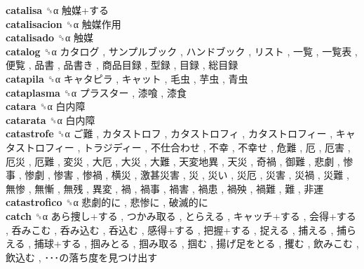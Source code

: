 \textbf{catalisa} ␝α   触媒+する   \\
\textbf{catalisacion} ␝α   触媒作用   \\
\textbf{catalisado} ␝α   触媒   \\
\textbf{catalog} ␝α   カタログ ,  サンプルブック ,  ハンドブック ,  リスト ,  一覧 ,  一覧表 ,  便覧 ,  品書 ,  品書き ,  商品目録 ,  型録 ,  目録 ,  総目録   \\
\textbf{catapila} ␝α   キャタピラ ,  キャット ,  毛虫 ,  芋虫 ,  青虫   \\
\textbf{cataplasma} ␝α   プラスター ,  漆喰 ,  漆食   \\
\textbf{catara} ␝α   白内障   \\
\textbf{catarata} ␝α   白内障   \\
\textbf{catastrofe} ␝α   ご難 ,  カタストロフ ,  カタストロフィ ,  カタストロフィー ,  キャタストロフィー ,  トラジディー ,  不仕合わせ ,  不幸 ,  不幸せ ,  危難 ,  厄 ,  厄害 ,  厄災 ,  厄難 ,  変災 ,  大厄 ,  大災 ,  大難 ,  天変地異 ,  天災 ,  奇禍 ,  御難 ,  悲劇 ,  惨事 ,  惨劇 ,  惨害 ,  惨禍 ,  横災 ,  激甚災害 ,  災 ,  災い ,  災厄 ,  災害 ,  災禍 ,  災難 ,  無惨 ,  無慚 ,  無残 ,  異変 ,  禍 ,  禍事 ,  禍害 ,  禍患 ,  禍殃 ,  禍難 ,  難 ,  非運   \\
\textbf{catastrofico} ␝α   悲劇的に ,  悲惨に ,  破滅的に   \\
\textbf{catch} ␝α   あら捜し+する ,  つかみ取る ,  とらえる ,  キャッチ+する ,  会得+する ,  呑みこむ ,  呑み込む ,  呑込む ,  感得+する ,  把握+する ,  捉える ,  捕える ,  捕らえる ,  捕球+する ,  掴みとる ,  掴み取る ,  掴む ,  揚げ足をとる ,  攫む ,  飲みこむ ,  飲込む ,  ･･･の落ち度を見つけ出す   \\
